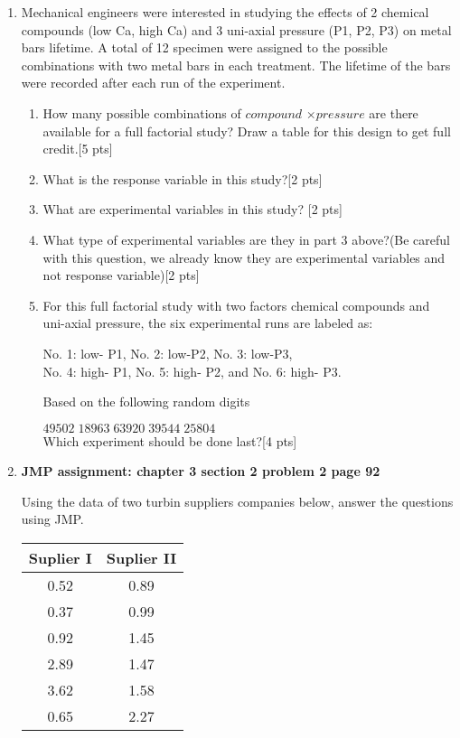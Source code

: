 \documentclass[11pt]{article}\usepackage[]{graphicx}\usepackage[]{color}
\begin{document}
\begin{enumerate}
\item  Mechanical engineers were interested in studying the effects of 2 chemical compounds 
	(low Ca, high Ca) and 3 uni-axial pressure (P1, P2, P3) on metal bars lifetime. A total of 12 specimen were assigned to the possible combinations with two metal bars in each treatment. The lifetime of the bars were recorded after each run of the experiment. 
\begin{enumerate}
	\item How many possible combinations of $compound$ $\times{ pressure}$ are there available for a full factorial study? Draw a table for this design to get full credit.[5 pts]
	\item What is the response variable in this study?[2 pts]
	\item What are experimental variables in this study? [2 pts]
	\item What type of experimental variables are they in part 3 above?(Be careful with this question, we already know they are experimental variables and not response variable)[2 pts]
	\item For this full factorial study with two factors chemical compounds and uni-axial pressure, the six experimental runs are labeled as:
	
	No. 1:  low- P1, \hspace{0.5cm} No. 2:  low-P2,
	\hspace{0.5cm} No. 3: low-P3, \\  No. 4:  high- P1,
	\hspace{0.5cm} No. 5:  high- P2, \hspace{0.1 cm}and
	\hspace{0.1cm} No. 6:  high- P3.
	
	\noindent Based on the following random digits
	
	\hspace{3.5cm}$49502 \; 18963 \; 63920 \; 39544 \; 25804$\\
	Which experiment should be done last?[4 pts]
\end{enumerate}

\item \textbf{JMP assignment: chapter 3 section 2 problem 2 page 92}

Using the data of two turbin suppliers companies below, answer the questions using JMP.

\begin{center}
	\begin{tabular}{|cc|}	
		\hline
		Suplier I & Suplier II\\
		\hline
		0.52 & 0.89 \\
		0.37 & 0.99 \\ 
		0.92 & 1.45     \\
		2.89 & 1.47     \\
	    3.62 & 1.58     \\
	    0.65 & 2.27     \\
 

\end{tabular}
\end{center}
\end{enumerate}
\end{document}

